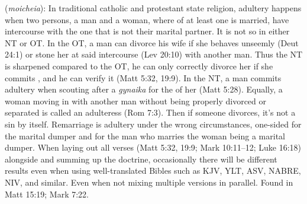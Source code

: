 \item[Adultery,]

(\textit{moicheia}):
In traditional catholic and protestant state religion, adultery happens when two persons, a man and a woman, where of at least one is married, have intercourse with the one that is not their marital partner. It is not so in either NT or OT. In the OT, a man can divorce his wife if she behaves unseemly (Deut 24:1) or stone her at said intercourse (Lev 20:10) with another man. Thus the NT is sharpened compared to the OT, he can only correctly divorce her if she commits , and he can verify it (Matt 5:32, 19:9). In the NT, a man commits adultery when scouting after a \emph{gynaika} for the  of her (Matt 5:28). Equally, a woman moving in with another man without being properly divorced or separated is called an adulteress (Rom 7:3). Then if someone divorces, it’s not a sin by itself. Remarriage is adultery under the wrong circumstances, one-sided for the marital dumper and for the man who marries the woman being a marital dumper. When laying out all verses (Matt 5:32, 19:9; Mark 10:11--12; Luke 16:18) alongside and summing up the doctrine, occasionally there will be different results even when using well-translated Bibles such as KJV, YLT, ASV, NABRE, NIV, and similar. Even when not mixing multiple versions in parallel.
Found in Matt 15:19; Mark 7:22.
